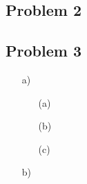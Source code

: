 \documentclass{article}
\begin{document}

\subsection*{Problem 2}



\subsection*{Problem 3}

\begin{itemize}
	\item[a)] 
		\begin{itemize}
			\item[(a)] 
			
			\item[(b)]
			
			\item[(c)]
			
		\end{itemize}
	
	\item[b)] 
		
\end{itemize}

\end{document}
